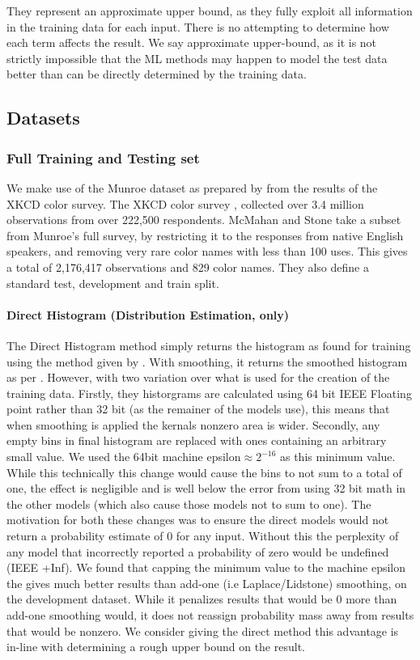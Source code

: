\documentclass[11pt,a4paper]{article}
\newcommand{\parencite}{\citep}
\newcommand{\textcite}{\citet}
\begin{document}
They represent an approximate upper bound, as they fully exploit all information in the training data for each input.
There is no attempting to determine how each term affects the result.
We say approximate upper-bound, as it is not strictly impossible that the ML methods may happen to model the test data better than can be directly determined by the training data.
\subsection{Datasets}


\subsubsection{Full Training and Testing set}
We make use of the  Munroe dataset as prepared by \textcite{mcmahan2015bayesian} from the results of the XKCD color survey.
The XKCD color survey \parencite{Munroe2010XKCDdataset}, collected over 3.4 million observations from over 222,500 respondents.
McMahan and Stone take a subset from Munroe's full survey, by restricting it to the responses from native English speakers, 
and removing very rare color names with less than 100 uses.
This gives a total of 2,176,417 observations and 829 color names. 
They also define a standard test, development and train split.
\paragraph{Direct Histogram (Distribution Estimation, only)}\label{sec:direct-histogram}
The Direct Histogram method simply returns the histogram as found for training using the method given by .
With smoothing, it returns the smoothed histogram as per .
However, with two variation over what is used for the creation of the training data.
Firstly, they historgrams are calculated using 64 bit IEEE Floating point rather than 32 bit (as the remainer of the models use), this means that when smoothing is applied the kernals nonzero area is wider.
Secondly, any empty bins in final histogram are replaced with ones containing an arbitrary small value.
We used the 64bit machine epsilon$\approx 2^{-16}$ as this minimum value.
While this technically this change would cause the bins to not sum to a total of one, the effect is negligible and is well below the error from using 32 bit math in the other models (which also cause those models not to sum to one).
The motivation for both these changes was to ensure the direct models would not return a probability estimate of 0 for any input.
Without this the perplexity of any model that incorrectly reported a probability of zero would be undefined (IEEE +Inf).
We found that capping the minimum value to the machine epsilon the gives much better results than add-one (i.e Laplace/Lidstone) smoothing, on the development dataset.
While it penalizes results that would be 0 more than add-one smoothing would, it does not reassign probability mass away from results that would be nonzero.
We consider giving the direct method this advantage is in-line with determining a rough upper bound on the result.
\end{document}
